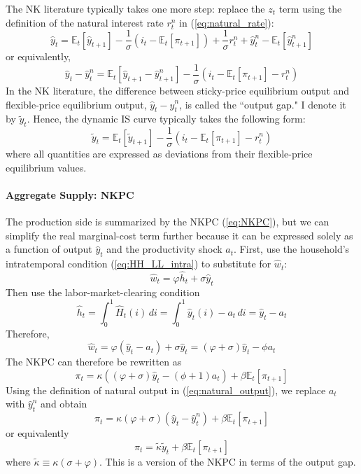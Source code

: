 \documentclass[12pt]{article}
\newcommand{\E}{\mathbb{E}}
\begin{document}
The NK literature typically takes one more step: replace the $z_t$ term using the definition of the natural interest rate $r_t^n$ in (\ref{eq:natural_rate}):
\begin{equation*}
	\hat{y}_t = \E_t [\hat{y}_{t+1}] - \frac{1}{\sigma} (i_t - \E_t[\pi_{t+1}]) + \frac{1}{\sigma} r_t^n + \hat{y}_t^n - \E_t [\hat{y}_{t+1}^n]
\end{equation*}
or equivalently,
\begin{equation*}
	\hat{y}_t - \hat{y}_t^n = \E_t [\hat{y}_{t+1} - \hat{y}_{t+1}^n] - \frac{1}{\sigma} (i_t - \E_t[\pi_{t+1}]-r_t^n)  
\end{equation*}
In the NK literature, the difference between sticky-price equilibrium output and flexible-price equilibrium output, $\hat{y}_t - \hat{y}_t^n$, is called the ``output gap." I denote it by $\tilde{y}_t$. Hence, the dynamic IS curve typically takes the following form:
\begin{equation}
	\tilde{y}_t = \E_t [\tilde{y}_{t+1}] - \frac{1}{\sigma} (i_t - \E_t[\pi_{t+1}]-r_t^n) 
\end{equation} 
where all quantities are expressed as deviations from their flexible-price equilibrium values.


\paragraph{Aggregate Supply: NKPC \\ [6pt]}
The production side is summarized by the NKPC (\ref{eq:NKPC}), but we can simplify the real marginal-cost term further because it can be expressed solely as a function of output $\hat{y}_t$ and the productivity shock $a_t$. First, use the household's intratemporal condition (\ref{eq:HH_LL_intra}) to substitute for $\hat{w}_t$:  
\[\hat{w}_t = \varphi \hat{h}_t + \sigma \hat{y}_t \]
Then use the labor-market-clearing condition
\[\hat{h}_t = \int_0^1 \hat{H}_t(i) \,di = \int_0^1 \hat{y}_t(i) - a_t \, di = \hat{y}_t - a_t \] 
Therefore,
\begin{equation}
	\hat{w}_t = \varphi (\hat{y}_t - a_t) + \sigma \hat{y}_t = (\varphi + \sigma) \hat{y}_t - \phi a_t
\end{equation}
The NKPC can therefore be rewritten as 
\begin{equation}
\pi_t = \kappa ((\varphi + \sigma) \hat{y}_t - (\phi+1) a_t) + \beta \E_t [\pi_{t+1}]
\end{equation}
Using the definition of natural output in (\ref{eq:natural_output}), we replace $a_t$ with $\hat{y}_t^n$ and obtain
\begin{equation*}
	\pi_t = \kappa (\varphi + \sigma) (\hat{y}_t - \hat{y}_t^n) + \beta \E_t [\pi_{t+1}]
\end{equation*}
or equivalently
\begin{equation} \label{eq:NKPC_with_gaps}
	\pi_t = \tilde{\kappa} \tilde{y}_t + \beta \E_t [\pi_{t+1}]
\end{equation}
where $\tilde{\kappa} \equiv \kappa (\sigma + \varphi)$. This is a version of the NKPC in terms of the output gap.
\end{document}

